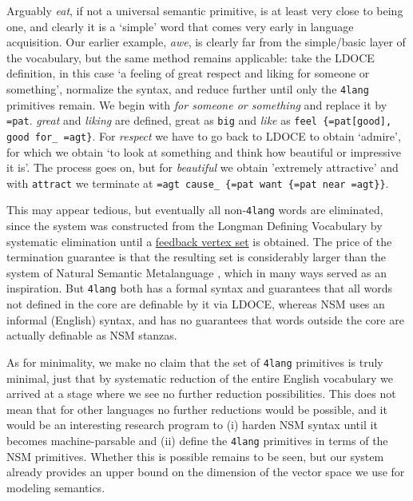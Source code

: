 \documentclass[output=paper,colorlinks=true,citecolor=brown]{langscibook}
\begin{document}
Arguably {\it eat}, if not a universal semantic primitive, is at least very
close to being one, and clearly it is a `simple' word \citet{Kornai:2021} that
comes very early in language acquisition. Our earlier example, {\it awe}, is
clearly far from the simple/basic layer of the vocabulary, but the same method
remains applicable: take the LDOCE definition, in this case `a feeling of
great respect and liking for someone or something', normalize the syntax, and
reduce further until only the \texttt{4lang} primitives remain. We begin with
{\it for someone or something} and replace it by \texttt{=pat}. {\it great}
and {\it liking} are defined, great as \texttt{big} and {\it like} as
\texttt{feel \{=pat[good], good for\_ =agt\}}. For {\it respect} we have to
go back to LDOCE to obtain `admire', for which we obtain `to look at something
and think how beautiful or impressive it is'. The process goes on, but for
{\it beautiful} we obtain 'extremely attractive' and with \texttt{attract} we
terminate at \texttt{=agt cause\_ \{=pat want \{=pat near =agt\}\}}.

This may appear tedious, but eventually all non-\texttt{4lang} words are
eliminated, since the system was constructed from the Longman Defining
Vocabulary by systematic elimination \citep{Acs:2019b} until a
\href{https://en.wikipedia.org/wiki/Feedback_vertex_set}{feedback vertex set}
is obtained. The price of the termination guarantee is that the resulting set
is considerably larger than the system of Natural Semantic Metalanguage
\citep{Wierzbicka:1992,Wierzbicka:1996,Goddard:2002}, which in many ways
served as an inspiration. But \texttt{4lang} both has a formal syntax and
guarantees that all words not defined in the core are definable by it via
LDOCE, whereas NSM uses an informal (English) syntax, and has no guarantees
that words outside the core are actually definable as NSM stanzas.

As for minimality, we make no claim that the set of \texttt{4lang} primitives
is truly minimal, just that by systematic reduction of the entire English
vocabulary we arrived at a stage where we see no further reduction
possibilities.  This does not mean that for other languages no further
reductions would be possible, and it would be an interesting research program
to (i) harden NSM syntax until it becomes machine-parsable and (ii) define the
\texttt{4lang} primitives in terms of the NSM primitives. Whether this is
possible remains to be seen, but our system already provides an upper bound on
the dimension of the vector space we use for modeling semantics.
\end{document}
